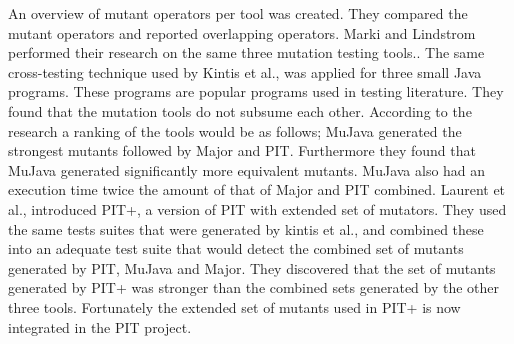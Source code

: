 \documentclass[../main]{subfiles}
\begin{document}
An overview of mutant operators per tool was created. 
They compared the mutant operators and reported overlapping operators.
\newline
Marki and Lindstrom performed their research on the same three mutation testing tools.\cite{Marki2017MutationJava}. 
The same cross-testing technique used by Kintis et al., was applied for three small Java programs. 
These programs are popular programs used in testing literature.
They found that the mutation tools do not subsume  each other. 
According to the research a ranking of the tools would be as follows; MuJava generated the strongest mutants followed by Major and PIT.
Furthermore they found that MuJava generated significantly more equivalent mutants.
MuJava also had an execution time twice the amount of that of Major and PIT combined.
\newline
Laurent et al., introduced PIT+, a version of PIT with extended set of mutators\cite{Laurent2017AssessingPIT}.
They used the same tests suites that were generated by kintis et al., and combined these into an adequate test suite that would detect the combined set of mutants generated by PIT, MuJava and Major. 
They discovered that the set of mutants generated by PIT+ was stronger than the combined sets generated by the other three tools.
Fortunately the extended set of mutants used in PIT+ is now integrated in the PIT project\cite{pit+}.
\end{document}
